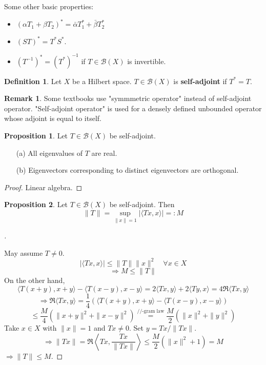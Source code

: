 \documentclass{article}
\theoremstyle{definition}
\newtheorem{dfn}{Definition}
\newtheorem{rem}{Remark}
\newtheorem{prop}{Proposition}
\newenvironment{proofs}[1][\proofname]{%
  \begin{proof}[#1]$ $\par\nobreak\ignorespaces
}{%
  \end{proof}
}
\newcommand{\B}{\mathcal B}
\begin{document}
Some other basic properties:
\begin{itemize}
	\item $(\alpha T_1 + \beta T_2)^* = \bar{\alpha} T_1^* + \bar{\beta} T_2^*$

	\item $(ST)^* = T^* S^*$.

	\item $(T^{-1})^* = (T^*)^{-1}$ if $T \in \B (X)$ is invertible.
\end{itemize}

\begin{dfn}
	Let $X$ be a Hilbert space.
	$T \in \B(X)$ is \textbf{self-adjoint} if $T^* = T$.
\end{dfn}

\begin{rem}
	Some textbooks use "symmmetric operator" instead of self-adjoint operator.
	"Self-adjoint operator" is used for a densely defined unbounded operator whose adjoint is equal to itself.
\end{rem}

\begin{prop}
	Let $T \in \B(X)$ be self-adjoint.
	\begin{enumerate}
		\item[(a)] All eigenvalues of $T$ are real.

		\item[(b)] Eigenvectors corresponding to distinct eigenvectors are orthogonal.
	\end{enumerate}
\end{prop}

\begin{proof}
	Linear algebra.
\end{proof}

\begin{prop}
	Let $T \in \B(X)$ be self-adjoint.
	Then 
	\[
		\|T\| = \sup_{\|x\| = 1} |\langle T x, x\rangle| =: M
	\]
\end{prop}

\begin{proofs}
	May assume $T \neq 0$.
	\[
		|\langle T x, x \rangle| \leq \|T\|\|x\|^2 \quad \forall x \in X
	\]
	\[
		\Rightarrow M \leq \|T\|
	\]
	On the other hand, 
	\[
		\langle T(x + y), x + y \rangle - \langle T(x - y), x - y \rangle = 2 \langle T x, y \rangle + 2 \langle T y, x \rangle = 4 \Re \langle T x, y \rangle
	\]
	\[
		\Rightarrow \Re \langle T x, y \rangle = \frac{1}{4} ( \langle T (x + y), x + y \rangle - \langle T(x - y), x - y \rangle ) 
	\]
	\[
		\leq \frac{M}{4} ( \|x + y\|^2 + \|x - y\|^2) \stackrel{\text{//-gram law}}{=} \frac{M}{2} (\|x\|^2 + \|y\|^2)
	\]
	Take $x \in X$ with $\|x\| = 1$ and $T x \neq 0$.
	Set $y = Tx/\|T x\|$.
	\[
		\Rightarrow \|T x\| = \Re \left\langle Tx, \frac{T x}{\|T x\|} \right\rangle \leq \frac{M}{2} (\|x\|^2 + 1) = M
	\]
	$\Rightarrow \|T\| \leq M$.
\end{proofs}
\end{document}
